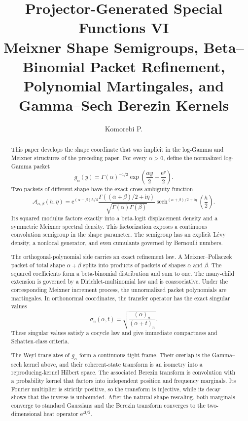 \documentclass[11pt,openany]{report}
\title{\textbf{Projector-Generated Special Functions VI}\\[0.25em]
\Large Meixner Shape Semigroups, Beta--Binomial Packet Refinement, Polynomial Martingales, and Gamma--Sech Berezin Kernels}
\author{Komorebi P.}
\date{}
\theoremstyle{definition}
\theoremstyle{remark}
\newcommand{\e}{\mathrm e}
\newcommand{\ii}{\mathrm i}
\newcommand{\sech}{\operatorname{sech}}
\newcommand{\Acal}{\mathcal A}
\begin{document}
\hypersetup{pageanchor=false}
\maketitle

\begin{abstract}
This paper develops the shape coordinate that was implicit in the log-Gamma and Meixner structures of the preceding paper. For every \(\alpha>0\), define the normalized log-Gamma packet
\[
g_\alpha(y)
=
\Gamma(\alpha)^{-1/2}
\exp\!\left(
\frac{\alpha y}{2}-\frac{\e^y}{2}
\right).
\]
Two packets of different shape have the exact cross-ambiguity function
\[
\boxed{
\Acal_{\alpha,\beta}(h,\eta)
=
\e^{(\alpha-\beta)h/4}
\frac{\Gamma((\alpha+\beta)/2+\ii\eta)}
{\sqrt{\Gamma(\alpha)\Gamma(\beta)}}
\sech^{(\alpha+\beta)/2+\ii\eta}\!\left(\frac h2\right).
}
\]
Its squared modulus factors exactly into a beta-logit displacement density and a symmetric Meixner spectral density. This factorization exposes a continuous convolution semigroup in the shape parameter. The semigroup has an explicit L\'evy density, a nonlocal generator, and even cumulants governed by Bernoulli numbers.

The orthogonal-polynomial side carries an exact refinement law. A Meixner--Pollaczek packet of total shape \(\alpha+\beta\) splits into products of packets of shapes \(\alpha\) and \(\beta\). The squared coefficients form a beta-binomial distribution and sum to one. The many-child extension is governed by a Dirichlet-multinomial law and is coassociative. Under the corresponding Meixner increment process, the unnormalized packet polynomials are martingales. In orthonormal coordinates, the transfer operator has the exact singular values
\[
\boxed{
\sigma_n(\alpha,t)
=
\sqrt{\frac{(\alpha)_n}{(\alpha+t)_n}}.
}
\]
These singular values satisfy a cocycle law and give immediate compactness and Schatten-class criteria.

The Weyl translates of \(g_\alpha\) form a continuous tight frame. Their overlap is the Gamma--sech kernel above, and their coherent-state transform is an isometry into a reproducing-kernel Hilbert space. The associated Berezin transform is convolution with a probability kernel that factors into independent position and frequency marginals. Its Fourier multiplier is strictly positive, so the transform is injective, while its decay shows that the inverse is unbounded. After the natural shape rescaling, both marginals converge to standard Gaussians and the Berezin transform converges to the two-dimensional heat operator \(\e^{\Delta/2}\).


\end{abstract}
\end{document}
